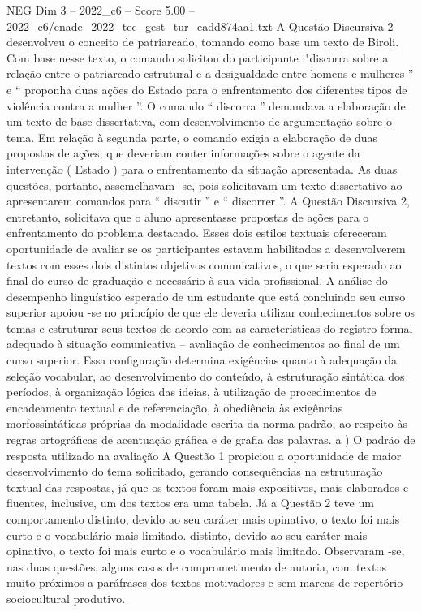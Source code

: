 \begin{textsample}{NEG Dim 3 – 2022\_c6 – Score 5.00 – 2022\_c6/enade\_2022\_tec\_gest\_tur\_eadd874aa1.txt}
A Questão Discursiva 2 desenvolveu o conceito de patriarcado, tomando como base um texto de Biroli.
Com base nesse texto, o comando solicitou do participante :"discorra sobre a relação entre o patriarcado estrutural e a desigualdade entre homens e mulheres ” e “ proponha duas ações do Estado para o enfrentamento dos diferentes tipos de violência contra a mulher ”.
O comando “ discorra ” demandava a elaboração de um texto de base dissertativa, com desenvolvimento de argumentação sobre o tema.
Em relação à segunda parte, o comando exigia a elaboração de duas propostas de ações, que deveriam conter informações sobre o agente da intervenção ( Estado ) para o enfrentamento da situação apresentada.
As duas questões, portanto, assemelhavam -se, pois solicitavam um texto dissertativo ao apresentarem comandos para “ discutir ” e “ discorrer ”.
A Questão Discursiva 2, entretanto, solicitava que o aluno apresentasse propostas de ações para o enfrentamento do problema destacado.
Esses dois estilos textuais ofereceram oportunidade de avaliar se os participantes estavam habilitados a desenvolverem textos com esses dois distintos objetivos comunicativos, o que seria esperado ao final do curso de graduação e necessário à sua vida profissional.
A análise do desempenho linguístico esperado de um estudante que está concluindo seu curso superior apoiou -se no princípio de que ele deveria utilizar conhecimentos sobre os temas e estruturar seus textos de acordo com as características do registro formal adequado à situação comunicativa – avaliação de conhecimentos ao final de um curso superior.
Essa configuração determina exigências quanto à adequação da seleção vocabular, ao desenvolvimento do conteúdo, à estruturação sintática dos períodos, à organização lógica das ideias, à utilização de procedimentos de encadeamento textual e de referenciação, à obediência às exigências morfossintáticas próprias da modalidade escrita da norma-padrão, ao respeito às regras ortográficas de acentuação gráfica e de grafia das palavras. a ) O padrão de resposta utilizado na avaliação A Questão 1 propiciou a oportunidade de maior desenvolvimento do tema solicitado, gerando consequências na estruturação textual das respostas, já que os textos foram mais expositivos, mais elaborados e fluentes, inclusive, um dos textos era uma tabela.
Já a Questão 2 teve um comportamento distinto, devido ao seu caráter mais opinativo, o texto foi mais curto e o vocabulário mais limitado. distinto, devido ao seu caráter mais opinativo, o texto foi mais curto e o vocabulário mais limitado.
Observaram -se, nas duas questões, alguns casos de comprometimento de autoria, com textos muito próximos a paráfrases dos textos motivadores e sem marcas de repertório sociocultural produtivo.

\end{textsample}
